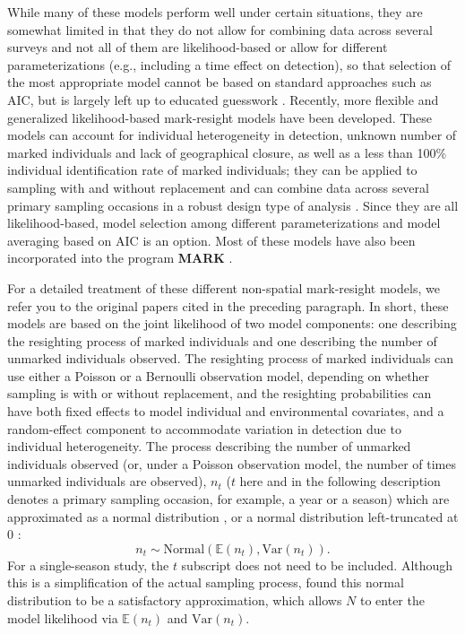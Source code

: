 While many of these models perform well under certain situations, they
are somewhat limited in that they do not allow for combining data
across several surveys \citep{mcclintock_etal:2006} and not all of
them are likelihood-based or allow for different parameterizations
(e.g., including a time effect on detection), so that selection of the
most appropriate model cannot be based on standard approaches such as
AIC, but is largely left up to educated guesswork
\citep{mcclintock_etal:2006}. Recently, more flexible and generalized
likelihood-based mark-resight models have been developed. These models
can account for individual heterogeneity in detection, unknown number
of marked individuals and lack of geographical closure, as well as a
less than 100\% individual identification rate of marked individuals;
they can be applied to sampling with and without replacement and can
combine data across several primary sampling occasions in a robust
design type of analysis
\citep{mcclintock_etal:2009biometrics,mcclintock_etal:2009mdp}. Since
they are all likelihood-based, model selection among different
parameterizations and model averaging based on AIC is an option. Most
of these models have also been incorporated into the program {\bf
  MARK} \citep{mcclintock_white:2010}.

For a detailed treatment of these different non-spatial mark-resight
models, we refer you to the original papers cited in the preceding
paragraph. In short, these models are based on the joint likelihood of
two model components: one describing the resighting process of marked
individuals and one describing the number of unmarked individuals
observed.  The resighting process of marked individuals can use either
a Poisson or a Bernoulli observation model, depending on whether
sampling is with or without replacement, and the resighting
probabilities can have both fixed effects to model individual and
environmental covariates, and a random-effect component to accommodate
variation in detection due to individual heterogeneity.  The process
describing the number of unmarked individuals observed (or, under a
Poisson observation model, the number of times unmarked individuals
are observed), $n_t$ ($t$ here and in the following description
denotes a primary sampling occasion, for example, a year or a season)
which are approximated as a normal distribution
\citep{mcclintock_etal:2006}, or a normal distribution left-truncated
at 0 \citep{mcclintock_etal:2009biometrics}:
\[
n_t \sim \mbox{Normal} (\mathbb{E}(n_t), \mbox{Var}(n_t)).
\]
For a single-season study, the $t$ subscript does not need to be
included.  Although this is a simplification of the actual sampling
process, \citet{mcclintock_etal:2006} found this normal distribution
to be a satisfactory approximation, which allows $N$ to enter the
model likelihood via $\mathbb{E}(n_t)$ and $\mbox{Var}(n_t)$.

